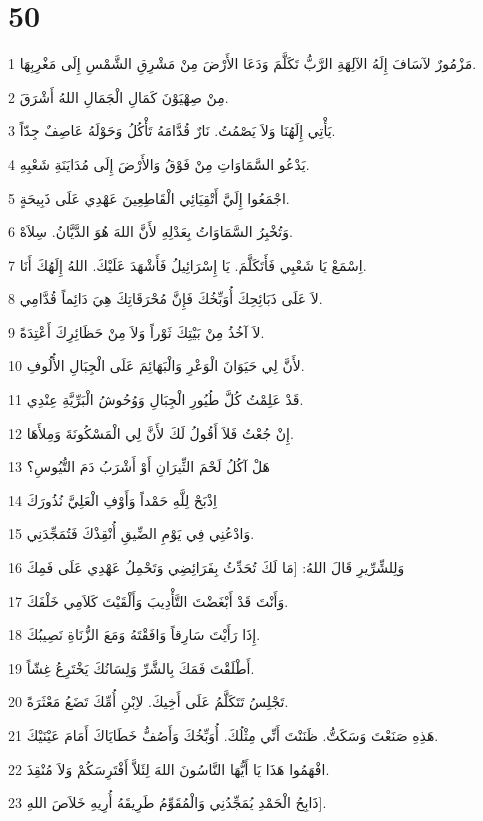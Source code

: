 \chapter{50}

\par 1 مَزْمُورٌ لآسَافَ إِلَهُ الآلِهَةِ الرَّبُّ تَكَلَّمَ وَدَعَا الأَرْضَ مِنْ مَشْرِقِ الشَّمْسِ إِلَى مَغْرِبِهَا.
\par 2 مِنْ صِهْيَوْنَ كَمَالِ الْجَمَالِ اللهُ أَشْرَقَ.
\par 3 يَأْتِي إِلَهُنَا وَلاَ يَصْمُتُ. نَارٌ قُدَّامَهُ تَأْكُلُ وَحَوْلَهُ عَاصِفٌ جِدّاً.
\par 4 يَدْعُو السَّمَاوَاتِ مِنْ فَوْقُ وَالأَرْضَ إِلَى مُدَايَنَةِ شَعْبِهِ.
\par 5 اجْمَعُوا إِلَيَّ أَتْقِيَائِي الْقَاطِعِينَ عَهْدِي عَلَى ذَبِيحَةٍ.
\par 6 وَتُخْبِرُ السَّمَاوَاتُ بِعَدْلِهِ لأَنَّ اللهَ هُوَ الدَّيَّانُ. سِلاَهْ.
\par 7 اِسْمَعْ يَا شَعْبِي فَأَتَكَلَّمَ. يَا إِسْرَائِيلُ فَأَشْهَدَ عَلَيْكَ. اللهُ إِلَهُكَ أَنَا.
\par 8 لاَ عَلَى ذَبَائِحِكَ أُوَبِّخُكَ فَإِنَّ مُحْرَقَاتِكَ هِيَ دَائِماً قُدَّامِي.
\par 9 لاَ آخُذُ مِنْ بَيْتِكَ ثَوْراً وَلاَ مِنْ حَظَائِرِكَ أَعْتِدَةً.
\par 10 لأَنَّ لِي حَيَوَانَ الْوَعْرِ وَالْبَهَائِمَ عَلَى الْجِبَالِ الأُلُوفِ.
\par 11 قَدْ عَلِمْتُ كُلَّ طُيُورِ الْجِبَالِ وَوُحُوشُ الْبَرِّيَّةِ عِنْدِي.
\par 12 إِنْ جُعْتُ فَلاَ أَقُولُ لَكَ لأَنَّ لِي الْمَسْكُونَةَ وَمِلأَهَا.
\par 13 هَلْ آكُلُ لَحْمَ الثِّيرَانِ أَوْ أَشْرَبُ دَمَ التُّيُوسِ؟
\par 14 اِذْبَحْ لِلَّهِ حَمْداً وَأَوْفِ الْعَلِيَّ نُذُورَكَ
\par 15 وَادْعُنِي فِي يَوْمِ الضِّيقِ أُنْقِذْكَ فَتُمَجِّدَنِي.
\par 16 وَلِلشِّرِّيرِ قَالَ اللهُ: [مَا لَكَ تُحَدِّثُ بِفَرَائِضِي وَتَحْمِلُ عَهْدِي عَلَى فَمِكَ
\par 17 وَأَنْتَ قَدْ أَبْغَضْتَ التَّأْدِيبَ وَأَلْقَيْتَ كَلاَمِي خَلْفَكَ.
\par 18 إِذَا رَأَيْتَ سَارِقاً وَافَقْتَهُ وَمَعَ الزُّنَاةِ نَصِيبُكَ.
\par 19 أَطْلَقْتَ فَمَكَ بِالشَّرِّ وَلِسَانُكَ يَخْتَرِعُ غِشّاً.
\par 20 تَجْلِسُ تَتَكَلَّمُ عَلَى أَخِيكَ. لاِبْنِ أُمِّكَ تَضَعُ مَعْثَرَةً.
\par 21 هَذِهِ صَنَعْتَ وَسَكَتُّ. ظَنَنْتَ أَنِّي مِثْلُكَ. أُوَبِّخُكَ وَأَصُفُّ خَطَايَاكَ أَمَامَ عَيْنَيْكَ.
\par 22 افْهَمُوا هَذَا يَا أَيُّهَا النَّاسُونَ اللهَ لِئَلاَّ أَفْتَرِسَكُمْ وَلاَ مُنْقِذَ.
\par 23 ذَابِحُ الْحَمْدِ يُمَجِّدُنِي وَالْمُقَوِّمُ طَرِيقَهُ أُرِيهِ خَلاَصَ اللهِ].

